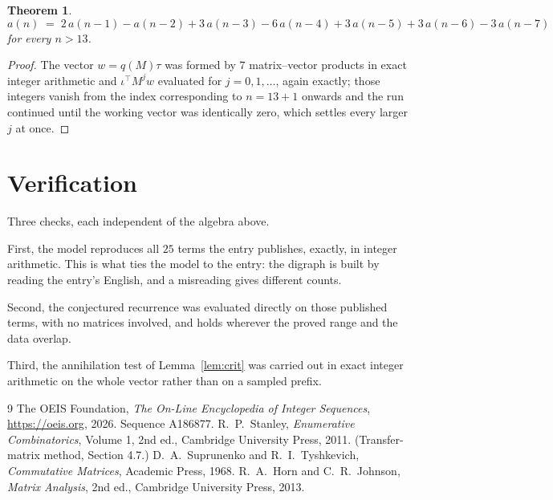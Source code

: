 \documentclass[11pt,a4paper]{article}
\theoremstyle{plain}
\newtheorem{theorem}{Theorem}
\theoremstyle{definition}
\begin{document}
\begin{theorem}
\[
a(n)\;=\;2\,a(n-1) - a(n-2) + 3\,a(n-3) - 6\,a(n-4) + 3\,a(n-5) + 3\,a(n-6) - 3\,a(n-7)
\]
for every $n>13$.
\end{theorem}

\begin{proof}
The vector $w=q(M)\tau$ was formed by $7$ matrix--vector products in exact integer
arithmetic and $\iota^{\!\top}M^{j}w$ evaluated for $j=0,1,\dots$, again exactly; those
integers vanish from the index corresponding to $n=13+1$ onwards and the run continued
until the working vector was identically zero, which settles every larger $j$ at once.
\end{proof}

\section{Verification}

Three checks, each independent of the algebra above.

First, the model reproduces all $25$ terms the entry publishes, exactly, in integer
arithmetic. This is what ties the model to the entry: the digraph is built by reading the
entry's English, and a misreading gives different counts.

Second, the conjectured recurrence was evaluated directly on those published terms, with no
matrices involved, and holds wherever the proved range and the data overlap.

Third, the annihilation test of Lemma~\ref{lem:crit} was carried out in exact integer
arithmetic on the whole vector rather than on a sampled prefix.

\begin{thebibliography}{9}
 The OEIS Foundation, \emph{The On-Line Encyclopedia of Integer
Sequences}, \url{https://oeis.org}, 2026. Sequence A186877.
 R.~P.~Stanley, \emph{Enumerative Combinatorics}, Volume 1, 2nd ed.,
Cambridge University Press, 2011. (Transfer-matrix method, Section 4.7.)
 D.~A.~Suprunenko and R.~I.~Tyshkevich, \emph{Commutative Matrices},
Academic Press, 1968.
 R.~A.~Horn and C.~R.~Johnson, \emph{Matrix Analysis}, 2nd ed., Cambridge
University Press, 2013.
\end{thebibliography}
\end{document}
